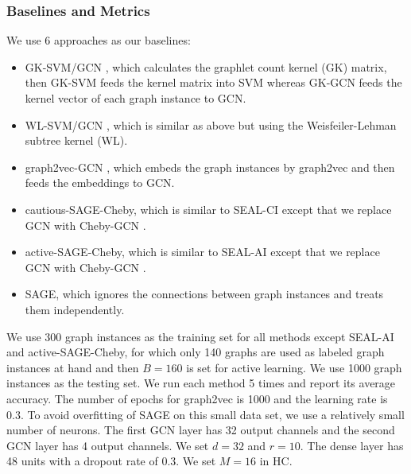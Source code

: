 \documentclass[sigconf]{acmart}
\newcommand{\eat}[1]{}
\begin{document}
\subsubsection{Baselines and Metrics}\label{syn.base}
We use 6 approaches as our baselines:
\begin{itemize}
\item GK-SVM/GCN \cite{shervashidze2009efficient}, which calculates the graphlet count kernel (GK) matrix, then GK-SVM feeds the kernel matrix into SVM \cite{hearst1998support} whereas GK-GCN feeds the kernel vector of each graph instance to GCN.

\item WL-SVM/GCN \cite{shervashidze2011weisfeiler}, which is similar as above but using the Weisfeiler-Lehman subtree kernel (WL).

\item graph2vec-GCN \cite{DBLP:journals/corr/NarayananCVCLJ17}, which embeds the graph instances by graph2vec and then feeds the embeddings to GCN.

\item cautious-SAGE-Cheby, which is similar to SEAL-CI except that we replace GCN with Cheby-GCN \cite{defferrard2016convolutional}.

\item active-SAGE-Cheby, which is similar to SEAL-AI except that we replace GCN with Cheby-GCN \cite{defferrard2016convolutional}.

\item SAGE, which ignores the connections between graph instances and treats them independently.
\end{itemize}

\eat{For the first two approaches, we also use SVM \cite{hearst1998support} to classify these graph instances on the computed kernel matrix and report the better performance from SVM and GCN.

}
We use 300 graph instances as the training set for all methods except SEAL-AI and active-SAGE-Cheby, for which only 140 graphs are used as labeled graph instances at hand and then $B =160$ is set for active learning.  We use 1000 graph instances as the testing set.  We run each method 5 times and report its average accuracy.  The number of epochs for graph2vec is 1000 and the learning rate is 0.3.  To avoid overfitting of SAGE on this small data set, we use a relatively small number of neurons.  The first GCN layer has 32 output channels and the second GCN layer has 4 output channels.  We set $d=32$ and $r=10$.  The dense layer has 48 units with a dropout rate of 0.3. We set $M = 16$ in HC.
\end{document}
